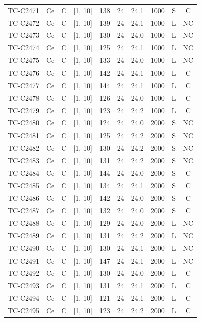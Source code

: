 \begin{longtable}{lccccccccc}
TC-C2471 & Ce & C & [1, 10] & 138 & 24 & 24.1 & 1000 & S & C \\
TC-C2472 & Ce & C & [1, 10] & 139 & 24 & 24.1 & 1000 & L & NC \\
TC-C2473 & Ce & C & [1, 10] & 130 & 24 & 24.0 & 1000 & L & NC \\
TC-C2474 & Ce & C & [1, 10] & 125 & 24 & 24.1 & 1000 & L & NC \\
TC-C2475 & Ce & C & [1, 10] & 133 & 24 & 24.0 & 1000 & L & NC \\
TC-C2476 & Ce & C & [1, 10] & 142 & 24 & 24.1 & 1000 & L & C \\
TC-C2477 & Ce & C & [1, 10] & 144 & 24 & 24.1 & 1000 & L & C \\
TC-C2478 & Ce & C & [1, 10] & 126 & 24 & 24.0 & 1000 & L & C \\
TC-C2479 & Ce & C & [1, 10] & 123 & 24 & 24.2 & 1000 & L & C \\
TC-C2480 & Ce & C & [1, 10] & 124 & 24 & 24.0 & 2000 & S & NC \\
TC-C2481 & Ce & C & [1, 10] & 125 & 24 & 24.2 & 2000 & S & NC \\
TC-C2482 & Ce & C & [1, 10] & 130 & 24 & 24.2 & 2000 & S & NC \\
TC-C2483 & Ce & C & [1, 10] & 131 & 24 & 24.2 & 2000 & S & NC \\
TC-C2484 & Ce & C & [1, 10] & 144 & 24 & 24.0 & 2000 & S & C \\
TC-C2485 & Ce & C & [1, 10] & 134 & 24 & 24.1 & 2000 & S & C \\
TC-C2486 & Ce & C & [1, 10] & 142 & 24 & 24.0 & 2000 & S & C \\
TC-C2487 & Ce & C & [1, 10] & 132 & 24 & 24.0 & 2000 & S & C \\
TC-C2488 & Ce & C & [1, 10] & 129 & 24 & 24.0 & 2000 & L & NC \\
TC-C2489 & Ce & C & [1, 10] & 131 & 24 & 24.2 & 2000 & L & NC \\
TC-C2490 & Ce & C & [1, 10] & 130 & 24 & 24.1 & 2000 & L & NC \\
TC-C2491 & Ce & C & [1, 10] & 147 & 24 & 24.1 & 2000 & L & NC \\
TC-C2492 & Ce & C & [1, 10] & 130 & 24 & 24.0 & 2000 & L & C \\
TC-C2493 & Ce & C & [1, 10] & 131 & 24 & 24.1 & 2000 & L & C \\
TC-C2494 & Ce & C & [1, 10] & 121 & 24 & 24.1 & 2000 & L & C \\
TC-C2495 & Ce & C & [1, 10] & 123 & 24 & 24.2 & 2000 & L & C \\

\end{longtable}
